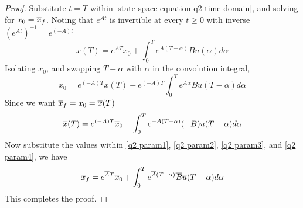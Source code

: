 \documentclass[../../main.tex]{subfiles}
\begin{document}
\begin{proof}
    Substitute $t = T$ within \eqref{state space equation q2 time domain}, and solving for $x_0 = \overline{x}_f$. Noting that $e^{At}$ is invertible at every $t\geq 0$ with inverse $(e^{At})^{-1} = e^{(-A)t}$
    \[
        x(T) = e^{AT}x_0 + \int^T_0 e^{A(T-\alpha)}Bu(\alpha)d\alpha
    \]
    Isolating $x_0$, and swapping $T-\alpha$ with $\alpha$ in the convolution integral,
    \[
    x_0 = e^{(-A)T}x(T) - e^{(-A)T}\int^T_0 e^{A\alpha}Bu(T-\alpha)d\alpha
    \]
    Since we want $\overline{x}_f = x_0 = \overline{x}(T)$
    \begin{align*}
        \overline{x}(T) = e^{(-A)T}\overline{x}_0 + \int^{T}_0 e^{-A(T-\alpha)}(-B)u(T-\alpha)d\alpha
    \end{align*}
    Now substitute the values within \ref{q2 param1}, \ref{q2 param2}, \ref{q2 param3}, and \ref{q2 param4}, we have
    \[
    \overline{x}_f = e^{\overline{A}T}\overline{x}_0 + \int^{T}_0 e^{\overline{A}(T-\alpha)}\overline{B}\overline{u}(T-\alpha)d\alpha
    \]
    This completes the proof.

\end{proof}
\end{document}

